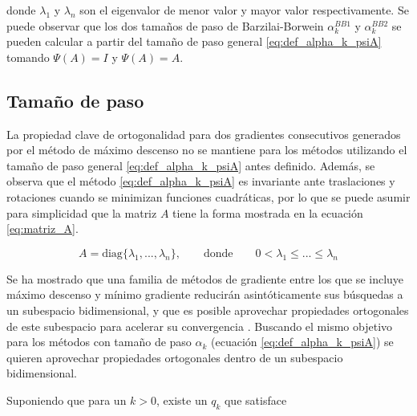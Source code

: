 donde $\lambda_1$ y $\lambda_n$ son el eigenvalor de menor valor y mayor valor respectivamente. Se puede observar que los dos tamaños de paso de Barzilai-Borwein $\alpha_k^{BB1}$ y $\alpha_k^{BB2}$ se pueden calcular a partir del tamaño de paso general \ref{eq:def_alpha_k_psiA} tomando $\Psi(A) = I$ y $\Psi(A) = A$.


\subsection*{Tamaño de paso}


La propiedad clave de ortogonalidad para dos gradientes consecutivos generados por el método de máximo descenso no se mantiene para los métodos utilizando el tamaño de paso general \ref{eq:def_alpha_k_psiA} antes definido. Además, se observa que el método \ref{eq:def_alpha_k_psiA} es invariante ante traslaciones y rotaciones cuando se minimizan funciones cuadráticas\cite{dai_2005}, por lo que se puede asumir para simplicidad que la matriz $A$ tiene la forma mostrada en la ecuación \ref{eq:matriz_A}.

\begin{equation}
    A = \text{diag}\{\lambda_1, ..., \lambda_n\}, \qquad \text{donde} \qquad 0<\lambda_1\leq...\leq\lambda_n \label{eq:matriz_A}
\end{equation}

Se ha mostrado que una familia de métodos de gradiente entre los que se incluye máximo descenso y mínimo gradiente reducirán asintóticamente sus búsquedas a un subespacio bidimensional, y que es posible aprovechar propiedades ortogonales de este subespacio para acelerar su convergencia \cite{huang_2022}. %
Buscando el mismo objetivo para los métodos con tamaño de paso $\alpha_k$ (ecuación \ref{eq:def_alpha_k_psiA}) se quieren aprovechar propiedades ortogonales dentro de un subespacio bidimensional.
\par Suponiendo que para un $k>0$, existe un $q_k$ que satisface

